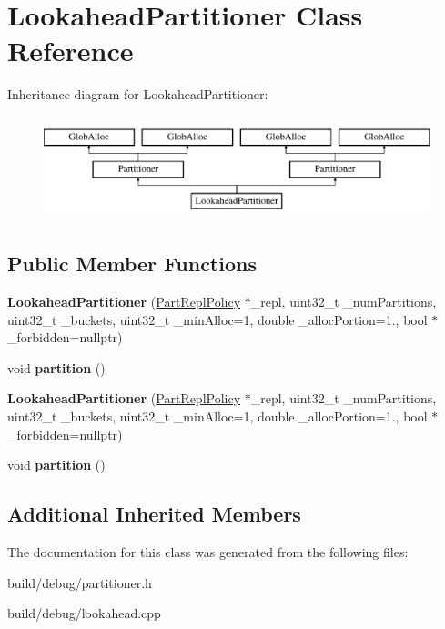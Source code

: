 \hypertarget{classLookaheadPartitioner}{\section{Lookahead\-Partitioner Class Reference}
\label{classLookaheadPartitioner}
}
Inheritance diagram for Lookahead\-Partitioner\-:\begin{figure}[H]
\begin{center}
\leavevmode
\includegraphics[height=3.000000cm]{classLookaheadPartitioner}
\end{center}
\end{figure}
\subsection*{Public Member Functions}
\begin{DoxyCompactItemize}
\item 
\hypertarget{classLookaheadPartitioner_a6f9409d5526f47560f6de4769911b97c}{{\bfseries Lookahead\-Partitioner} (\hyperlink{classPartReplPolicy}{Part\-Repl\-Policy} $\ast$\-\_\-repl, uint32\-\_\-t \-\_\-num\-Partitions, uint32\-\_\-t \-\_\-buckets, uint32\-\_\-t \-\_\-min\-Alloc=1, double \-\_\-alloc\-Portion=1., bool $\ast$\-\_\-forbidden=nullptr)}\label{classLookaheadPartitioner_a6f9409d5526f47560f6de4769911b97c}

\item 
\hypertarget{classLookaheadPartitioner_a205ac8b11251aea1baaf90f1399d33f3}{void {\bfseries partition} ()}\label{classLookaheadPartitioner_a205ac8b11251aea1baaf90f1399d33f3}

\item 
\hypertarget{classLookaheadPartitioner_a6f9409d5526f47560f6de4769911b97c}{{\bfseries Lookahead\-Partitioner} (\hyperlink{classPartReplPolicy}{Part\-Repl\-Policy} $\ast$\-\_\-repl, uint32\-\_\-t \-\_\-num\-Partitions, uint32\-\_\-t \-\_\-buckets, uint32\-\_\-t \-\_\-min\-Alloc=1, double \-\_\-alloc\-Portion=1., bool $\ast$\-\_\-forbidden=nullptr)}\label{classLookaheadPartitioner_a6f9409d5526f47560f6de4769911b97c}

\item 
\hypertarget{classLookaheadPartitioner_a205ac8b11251aea1baaf90f1399d33f3}{void {\bfseries partition} ()}\label{classLookaheadPartitioner_a205ac8b11251aea1baaf90f1399d33f3}

\end{DoxyCompactItemize}
\subsection*{Additional Inherited Members}


The documentation for this class was generated from the following files\-:\begin{DoxyCompactItemize}
\item 
build/debug/partitioner.\-h\item 
build/debug/lookahead.\-cpp\end{DoxyCompactItemize}

